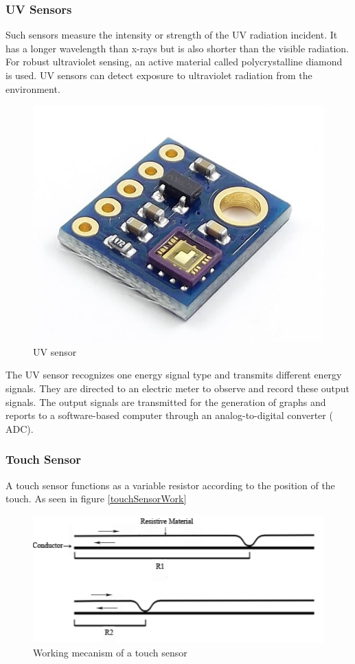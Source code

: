 \subsubsection{UV Sensors}

Such sensors measure the intensity or strength of the UV radiation incident. It has a longer wavelength than x-rays but is also shorter than the visible radiation. For robust ultraviolet sensing, an active material called polycrystalline diamond is used. UV sensors can detect exposure to ultraviolet radiation from the environment.


\begin{figure}[h]
  \centering
    \includegraphics[width=0.5\linewidth]{figures/uvSensor.jpg}
    \caption{UV sensor}
\label{fig:uvSensor }
\end{figure}


The UV sensor recognizes one energy signal type and transmits different energy signals. They are directed to an electric meter to observe and record these output signals. The output signals are transmitted for the generation of graphs and reports to a software-based computer through an analog-to-digital converter ( ADC).


\subsubsection{Touch Sensor}

A touch sensor functions as a variable resistor according to the position of the touch. As seen in figure \ref{touchSensorWork}

\begin{figure}[h]
  \centering
    \includegraphics[width=0.5\linewidth]{figures/touchSensorWork.png}
    \caption{Working mecanism of a touch sensor}
\label{fig:touchSensorWork }
\end{figure}

